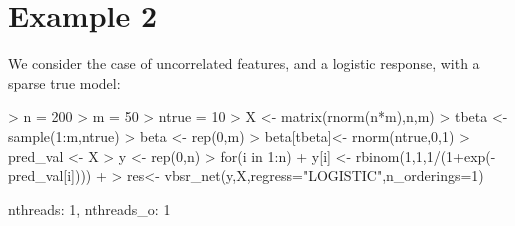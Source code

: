 \documentclass[a4paper]{article}
\begin{document}




\section{Example 2}
We consider the case of uncorrelated features, and a logistic response, with a sparse true model:

\begin{Schunk}
\begin{Sinput}
> n = 200
> m = 50
> ntrue = 10
> X <- matrix(rnorm(n*m),n,m)
> tbeta <- sample(1:m,ntrue)
> beta <- rep(0,m)
> beta[tbeta]<- rnorm(ntrue,0,1)
> pred_val <- X%*%beta
> y <- rep(0,n)
> for(i in 1:n){
+ 	y[i] <- rbinom(1,1,1/(1+exp(-pred_val[i])))
+ }
> res<- vbsr_net(y,X,regress="LOGISTIC",n_orderings=1)
\end{Sinput}
\begin{Soutput}
nthreads: 1, nthreads_o: 1
\end{Soutput}
\end{Schunk}
\end{document}
